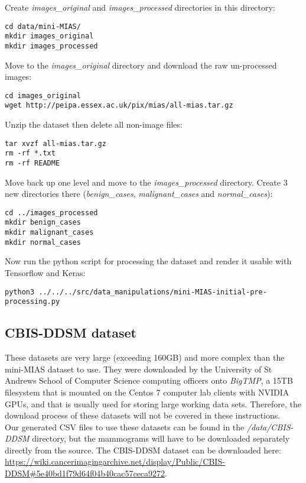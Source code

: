 Create \textit{images\_original} and \textit{images\_processed} directories in this directory: 

\begin{lstlisting}
cd data/mini-MIAS/
mkdir images_original
mkdir images_processed
\end{lstlisting}

Move to the \textit{images\_original} directory and download the raw un-processed images:

\begin{lstlisting}
cd images_original
wget http://peipa.essex.ac.uk/pix/mias/all-mias.tar.gz
\end{lstlisting}

Unzip the dataset then delete all non-image files:

\begin{lstlisting}
tar xvzf all-mias.tar.gz
rm -rf *.txt 
rm -rf README 
\end{lstlisting}

Move back up one level and move to the \textit{images\_processed} directory. Create 3 new directories there (\textit{benign\_cases}, \textit{malignant\_cases} and \textit{normal\_cases}):

\begin{lstlisting}
cd ../images_processed
mkdir benign_cases
mkdir malignant_cases
mkdir normal_cases
\end{lstlisting}

Now run the python script for processing the dataset and render it usable with Tensorflow and Keras:

\begin{lstlisting}
python3 ../../../src/data_manipulations/mini-MIAS-initial-pre-processing.py
\end{lstlisting}

\subsection{CBIS-DDSM dataset}

These datasets are very large (exceeding 160GB) and more complex than the mini-MIAS dataset to use. They were downloaded by the University of St Andrews School of Computer Science computing officers onto \textit{BigTMP}, a 15TB filesystem that is mounted on the Centos 7 computer lab clients with NVIDIA GPUs, and that is usually used for storing large working data sets. Therefore, the download process of these datasets will not be covered in these instructions.\\

Our generated CSV files to use these datasets can be found in the \textit{/data/CBIS-DDSM} directory, but the mammograms will have to be downloaded separately directly from the source. The CBIS-DDSM dataset can be downloaded here: \url{https://wiki.cancerimagingarchive.net/display/Public/CBIS-DDSM#5e40bd1f79d64f04b40cac57ceca9272}.
